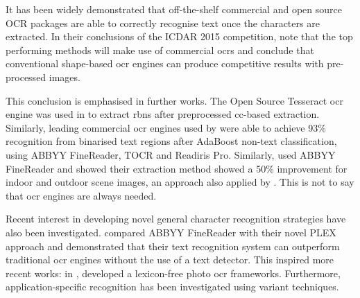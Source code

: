 It has been widely demonstrated that off-the-shelf commercial and open source OCR packages are able to correctly recognise text once the characters are extracted. In their conclusions of the ICDAR 2015 competition, \citeauthor{Karatzas:2015tj} note that the top performing methods will make use of commercial \glspl{ocr} and conclude that conventional shape-based \gls{ocr} engines can produce competitive results with pre-processed images. 

This conclusion is emphasised in further works. The Open Source Tesseract \gls{ocr} engine was used in \citet{Benami:2012jf} to extract \glspl{rbn} after preprocessed \gls{cc}-based extraction. Similarly, leading commercial \gls{ocr} engines used by \citet{XiangrongChen:2004ha} were able to achieve 93\% recognition from binarised text regions after AdaBoost non-text classification, using ABBYY FineReader, TOCR and Readiris Pro. Similarly, \citet{Gatos:2005wd} used ABBYY FineReader and showed their extraction method showed a 50\% improvement for indoor and outdoor scene images, an approach also applied by \citet{XiangrongChen:2004ha}. This is not to say that \gls{ocr} engines are always needed.

Recent interest in developing novel general character recognition strategies have also been investigated. \citet{Wang:2011tw} compared ABBYY FineReader with their novel PLEX approach and demonstrated that their text recognition system can outperform traditional \gls{ocr} engines without the use of a text detector. This inspired more recent works: in \citeyear{Lee:2016uy}, \citet{Lee:2016uy} developed a lexicon-free photo \gls{ocr} frameworks. Furthermore, application-specific recognition has been investigated using variant techniques.

